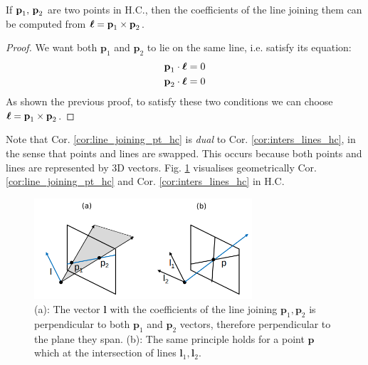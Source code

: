 \documentclass[a4paper]{article}
\begin{document}
\begin{corollary}
If $\textbf{\textup{p}}_1, \, \textbf{\textup{p}}_2$ are two points in H.C., then the coefficients of the line joining them can be computed from $\boldsymbol{\ell} = \textbf{\textup{p}}_1 \times \textbf{\textup{p}}_2$.
\label{cor:line_joining_pt_hc}
\end{corollary}
\begin{proof}
We want both $\textbf{p}_1$ and $\textbf{p}_2$ to lie on the same line, i.e. satisfy its equation:
\begin{align*}
    \textbf{p}_1 \cdot \boldsymbol{\ell} = 0\\
    \textbf{p}_2 \cdot \boldsymbol{\ell} = 0
\end{align*}
As shown the previous proof, to satisfy these two conditions we can choose $\boldsymbol{\ell} = \textbf{p}_1\times \textbf{p}_2$.
\end{proof}
Note that Cor. \ref{cor:line_joining_pt_hc} is \textit{dual} to Cor. \ref{cor:inters_lines_hc}, in the sense that points and lines are swapped. This occurs because both points and lines are represented by 3D vectors. Fig. \ref{fig:duality_vis} visualises geometrically Cor. \ref{cor:line_joining_pt_hc} and Cor. \ref{cor:inters_lines_hc} in H.C.

\begin{figure}[H]
    \centering
    \includegraphics[height=3.75cm]{img/duality_vis.png}
    \caption{(a): The vector $\textbf{l}$ with the coefficients of the line joining $\textbf{p}_1, \textbf{p}_2$ is perpendicular to both $\textbf{p}_1$ and $\textbf{p}_2$ vectors, therefore perpendicular to the plane they span. (b): The same principle holds for a point $\textbf{p}$ which at the intersection of lines $\textbf{l}_1, \textbf{l}_2$.}
    \label{fig:duality_vis}
\end{figure}
\end{document}
